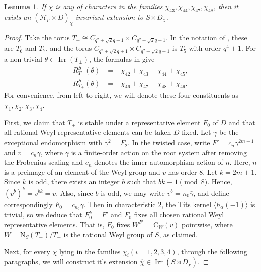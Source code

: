 \documentclass[11pt,a4paper]{article}
\numberwithin{equation}{section}
\newtheorem{lemma}[theorem]{Lemma}
\theoremstyle{definition}
\theoremstyle{remark}
\newcommand{\Irr}{\operatorname{Irr}}
\newcommand{\HH}{\mathcal H}
\newcommand{\NN}{\mathrm N}
\newcommand{\CC}{\mathrm C}
\begin{document}
\begin{lemma}\label{lem: The non-split Suzuki-centralizer families}
If $\chi$ is any of characters in the families $\chi_{43},\chi_{44},\chi_{47},\chi_{48}$, then it exists an $(\HH_p\times D)_\chi$-invariant extension  to $S\rtimes D_\chi$.
\end{lemma}
\begin{proof}
Take the torus $T_\pm\cong C_{q^2\pm\sqrt{2}q+1}\times C_{q^2\pm\sqrt{2}q+1}$. In the notation of \cite[Table~B.2]{HH}, these are $T_6$ and $T_7$, and the torus $C_{q^2+\sqrt{2}q+1}\times C_{q^2-\sqrt{2}q+1}$ is $T_5$ with order $q^4+1$. For a non-trivial $\theta\in\Irr(T_\pm)$, the formulas in \cite[Appendix~B, construction of the $g_8$ and $g_{10}$ series]{HH} give
\begin{align}
 R_{T_-}^S(\theta)&=-\chi_{42}+\chi_{43}+\chi_{44}+\chi_{45},\label{eq:dlminus}\\
 R_{T_+}^S(\theta)&=-\chi_{46}+\chi_{47}+\chi_{48}+\chi_{49}.\label{eq:dlplus}
\end{align}
For convenience, from left to right, we will denote these four constituents as $\chi_1,\chi_2,\chi_3,\chi_4$.

First, we claim that $T_\pm$ is stable under a representative element $F_0$ of $D$ and that all rational Weyl representative elements can be taken $D$-fixed.
Let $\gamma$ be the exceptional endomorphism with $\gamma^2=F_2$. In the twisted case, write $F'=c_n\gamma^{2m+1}$ and $v=c_n\bar\gamma$, where $\bar{\gamma}$ is a finite-order action on the root system after removing the Frobenius scaling and $c_n$ 
denotes the inner automorphism action of $n$. Here, $n$ is
a preimage of an element of the Weyl group and $v$ has order $8$. Let $k=2m+1$. Since \(k\) is odd, there exists an integer \(b\) such that $bk\equiv1\pmod8$.
Hence, $(v^b)^k=v^{bk}=v$. Also, since \(b\) is odd, we may write $v^b=n_0\bar\gamma$, and define correspondingly
$F_0=c_{n_0}\gamma$. Then in characteristic $2$, 
the Tits kernel $\langle h_\alpha(-1)\rangle$ is trivial, so
we deduce that $F_0^k=F'$ and $F_0$ fixes all chosen  rational Weyl representative elements. That is, $F_0$ fixes $W^{F'}=\CC_{W}(v)$ pointwise, where $W=\NN_S(T_{\pm})/T_\pm$ is the rational Weyl group of $S$,
as claimed.

Next, for every $\chi$ lying in the families $\chi_i(i=1,2,3,4)$, through the following paragraphs, we  will construct it's extension $\widehat \chi\in\Irr(S\rtimes D_\chi)$.  


\end{proof}
\end{document}
